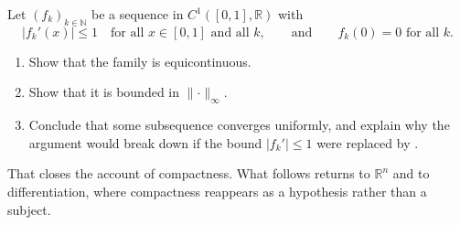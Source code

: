 \begin{aiexercise}
\label{ex:uniform_lipschitz_family}
Let $(f_k)_{k\in\mathbb{N}}$ be a sequence in $C^1([0,1],\mathbb{R})$ with
\[\lvert f_k'(x)\rvert \leq 1 \quad \text{for all } x \in [0,1] \text{ and all } k,
  \qquad\text{and}\qquad f_k(0) = 0 \text{ for all } k.\]
\begin{enumerate}[label=\textbf{(\alph*)}]
  \item Show that the family is equicontinuous.
  \item Show that it is bounded in $\lVert\cdot\rVert_\infty$.
  \item Conclude that some subsequence converges uniformly, and explain why the argument would
    break down if the bound $\lvert f_k'\rvert \leq 1$ were replaced by .
\end{enumerate}
\end{aiexercise}

That closes the account of compactness. What follows returns to $\mathbb{R}^n$ and to
differentiation, where compactness reappears as a hypothesis rather than a subject.
